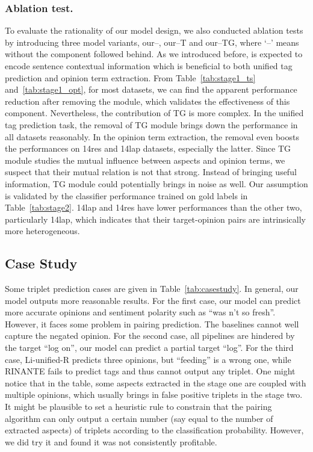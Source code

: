 \documentclass[letterpaper]{article} \usepackage{aaai20}  \usepackage{times}  \usepackage{helvet} \usepackage{courier}  \usepackage[hyphens]{url}  \usepackage{graphicx} \urlstyle{rm} \def\UrlFont{\rm}  \usepackage{graphicx}  \frenchspacing  \setlength{\pdfpagewidth}{8.5in}  \setlength{\pdfpageheight}{11in}
\begin{document}
\subsubsection{Ablation test.}
To evaluate the rationality of our model design, we also conducted ablation tests by introducing three model variants, our--, our--T and our--TG, where `--' means without the component followed behind. As we introduced before,  is expected to encode sentence contextual information which is beneficial to both unified tag prediction and opinion term extraction. 
From Table~\ref{tab:stage1_ts} and~\ref{tab:stage1_opt}, for most datasets, we can find the apparent performance reduction after removing the  module, which validates the effectiveness of this component.
Nevertheless, the contribution of TG is more complex. In the unified tag prediction task, the removal of TG module brings down the performance in all datasets reasonably. 
In the opinion term extraction, the removal even boosts the performances on 14res and 14lap datasets, especially the latter. Since TG module studies the mutual influence between aspects and opinion terms, we suspect that their mutual relation is not that strong.
Instead of bringing useful information, TG module could potentially brings in noise as well. Our assumption is validated by the classifier performance trained on gold labels in Table~\ref{tab:stage2}. 14lap and 14res have lower performances than the other two, particularly 14lap, which indicates that their target-opinion pairs are intrinsically more heterogeneous.



\subsection{Case Study}
Some triplet prediction cases are given in Table~\ref{tab:casestudy}. In general, our model outputs more reasonable results. For the first case, our model can predict more accurate opinions and sentiment polarity such as ``was n't so fresh''. However, it faces some problem in pairing prediction. The baselines cannot well capture the negated opinion. For the second case, all pipelines are hindered by the target ``log on'', our model can predict a partial target ``log''. For the third case, Li-unified-R predicts three opinions, but ``feeding'' is a wrong one, while RINANTE fails to predict tags and thus cannot output any triplet. 
One might notice that in the table, some aspects extracted in the stage one are coupled with multiple opinions, which usually brings in false positive triplets in the stage two. It might be plausible to set a heuristic rule to constrain that the pairing algorithm can only output a certain number (say equal to the number of extracted aspects) of triplets according to the classification probability. However, we did try it and found it was not consistently profitable. 
\end{document}
